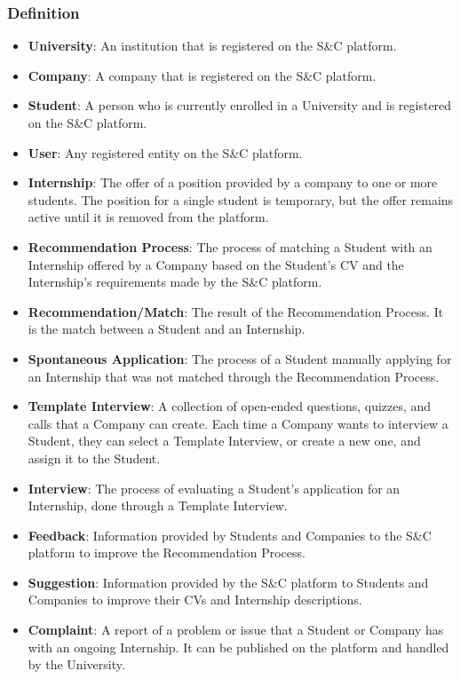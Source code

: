 \subsubsection{Definition}
\begin{itemize}
    \item \textbf{University}\label{def:university}: An institution that is registered on the S\&C platform.
    \item \textbf{Company}\label{def:compnay}: A company that is registered on the S\&C platform.
    \item \textbf{Student}\label{def:student}: A person who is currently enrolled in a University and is registered on the S\&C platform.
    \item \textbf{User}\label{def:user}: Any registered entity on the S\&C platform.
    \item \textbf{Internship}\label{def:internship}: The offer of a position provided by a company to one or more students. The position for a single student is temporary, but the offer remains active until it is removed from the platform.
    \item \textbf{Recommendation Process}\label{def:recommendationProcess}: The process of matching a Student with an Internship offered by a Company based on the Student's CV and the Internship's requirements made by the S\&C platform.
    \item \textbf{Recommendation/Match}\label{def:match}: The result of the Recommendation Process. It is the match between a Student and an Internship.
    \item \textbf{Spontaneous Application}\label{def:spontaneousApplication}: The process of a Student manually applying for an Internship that was not matched through the Recommendation Process.
    \item \textbf{Template Interview}\label{def:templateInterview}: A collection of open-ended questions, quizzes, and calls that a Company can create. Each time a Company wants to interview a Student, they can select a Template Interview, or create a new one, and assign it to the Student.
    \item \textbf{Interview}\label{def:Interview}: The process of evaluating a Student's application for an Internship, done through a Template Interview.
    \item \textbf{Feedback}\label{def:Feedback}: Information provided by Students and Companies to the S\&C platform to improve the Recommendation Process.
    \item \textbf{Suggestion}\label{def:suggestion}: Information provided by the S\&C platform to Students and Companies to improve their CVs and Internship descriptions.
    \item \textbf{Complaint}\label{def:complaint}: A report of a problem or issue that a Student or Company has with an ongoing Internship. It can be published on the platform and handled by the University.
\end{itemize}

